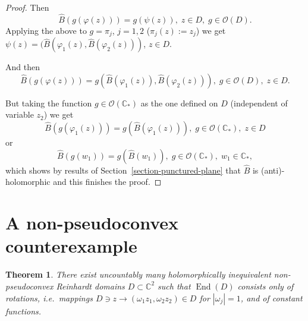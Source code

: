 \documentclass[a4paper,12pt]{amsart}
\newtheorem{theorem}{Theorem}[section]
\theoremstyle{definition}
\begin{document}
\begin{proof}

Then
\begin{equation}
    \widehat{B}(g(\varphi(z)))=g(\psi(z)),\; z\in D,\; g\in\mathcal O(D).
\end{equation}
Applying the above to $g=\pi_j$, $j=1,2$ ($\pi_j(z):=z_j$) we get
$\psi(z)=(\hat{B}(\varphi_1(z),\hat{B}(\varphi_2(z)))$, $z\in D$. 

And then
\begin{equation}
    \widehat{B}(g(\varphi(z)))=g(\widehat{B}(\varphi_1(z)),\widehat{B}(\varphi_2(z))),\;g\in\mathcal O(D),\; z\in D.
\end{equation}

But taking the function $g\in\mathcal O(\mathbb C_*)$ as the one defined on $D$ (independent of variable $z_2$) we get
\begin{equation}
    \hat{B}(g(\varphi_1(z)))=g(\hat{B}(\varphi_1(z))),\; g\in\mathcal O(\mathbb C_*),\; z\in D
\end{equation}
or
\begin{equation}
    \hat{B}(g(w_1))=g(\hat{B}(w_1)),\; g\in\mathcal O(\mathbb C_*),\; w_1\in\mathbb C_*,
\end{equation}
which shows by results of Section~\ref{section-punctured-plane} that $\hat{B}$ is (anti)-holomorphic and this finishes the proof.

\end{proof}


\section{A non-pseudoconvex counterexample}
\begin{theorem}
\label{thm:counterexample}
There exist uncountably many holomorphically inequivalent non-pseudoconvex Reinhardt domains $D\subset\mathbb C^2$ such that $\operatorname{End}(D)$ consists only of rotations, i.e.\ mappings $D\owns z\to(\omega_1z_1,\omega_2z_2)\in D$ for $|\omega_j|=1$, and of constant functions.
\end{theorem}
\end{document}
